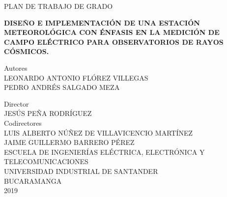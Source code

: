 \documentclass[12pt,a4paper,oneside]{book}
\title{}
\begin{document}
\begin{center}
\thispagestyle{empty}
\fontsize{11pt}{11pt}\selectfont 

PLAN DE TRABAJO DE GRADO 

\vspace{3cm}

\textbf { DISEÑO E IMPLEMENTACIÓN DE UNA ESTACIÓN METEOROLÓGICA CON ÉNFASIS EN LA MEDICIÓN DE CAMPO ELÉCTRICO PARA OBSERVATORIOS DE RAYOS CÓSMICOS.}


\vspace{3cm}

{ Autores}
\\
{ LEONARDO ANTONIO FLÓREZ VILLEGAS \\
PEDRO ANDRÉS SALGADO MEZA}

\vspace{2cm}
{ Director}
\\
{ JESÚS PEÑA RODRÍGUEZ}\\
\vspace{2cm}
{ Codirectores}\\
{ LUIS ALBERTO NÚÑEZ DE VILLAVICENCIO MARTÍNEZ} \\
{ JAIME GUILLERMO BARRERO PÉREZ } \\
\vspace{2cm}
{ ESCUELA DE INGENIERÍAS ELÉCTRICA, ELECTRÓNICA Y TELECOMUNICACIONES
}\\
{ UNIVERSIDAD INDUSTRIAL DE SANTANDER}\\
{ BUCARAMANGA}\\
{ 2019}

  \end{center}
\large
\end{document}
